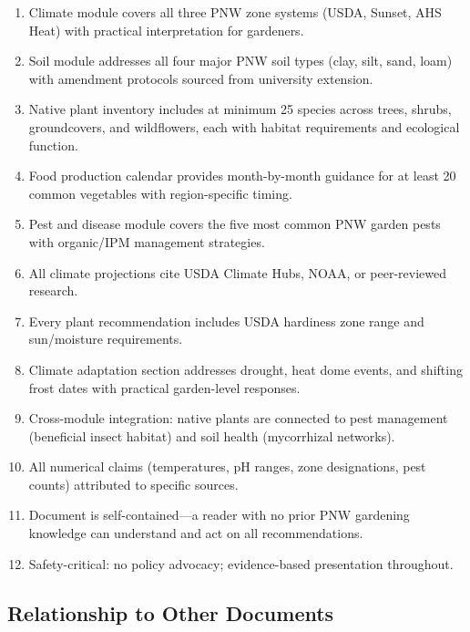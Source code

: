 \documentclass[11pt,letterpaper]{article}
\begin{document}
\begin{enumerate}[leftmargin=2em]
  \item Climate module covers all three PNW zone systems (USDA, Sunset, AHS Heat) with practical interpretation for gardeners.
  \item Soil module addresses all four major PNW soil types (clay, silt, sand, loam) with amendment protocols sourced from university extension.
  \item Native plant inventory includes at minimum 25 species across trees, shrubs, groundcovers, and wildflowers, each with habitat requirements and ecological function.
  \item Food production calendar provides month-by-month guidance for at least 20 common vegetables with region-specific timing.
  \item Pest and disease module covers the five most common PNW garden pests with organic/IPM management strategies.
  \item All climate projections cite USDA Climate Hubs, NOAA, or peer-reviewed research.
  \item Every plant recommendation includes USDA hardiness zone range and sun/moisture requirements.
  \item Climate adaptation section addresses drought, heat dome events, and shifting frost dates with practical garden-level responses.
  \item Cross-module integration: native plants are connected to pest management (beneficial insect habitat) and soil health (mycorrhizal networks).
  \item All numerical claims (temperatures, pH ranges, zone designations, pest counts) attributed to specific sources.
  \item Document is self-contained---a reader with no prior PNW gardening knowledge can understand and act on all recommendations.
  \item Safety-critical: no policy advocacy; evidence-based presentation throughout.
\end{enumerate}

\subsection{Relationship to Other Documents}
\end{document}
